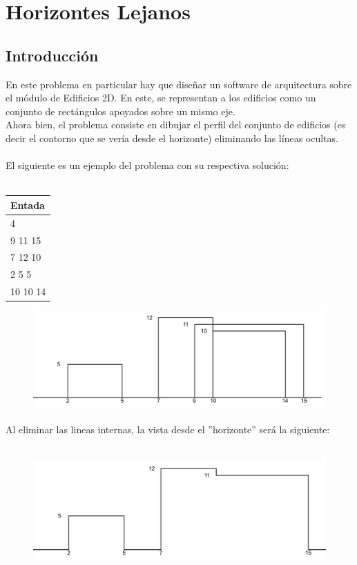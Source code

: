 \section{Horizontes Lejanos}
\subsection{Introducci\'on}

En este problema en particular hay que diseñar un software de arquitectura sobre el m\'odulo de Edificios 2D. En este, se representan a los edificios como un conjunto de rect\'angulos apoyados sobre un mismo eje. \\
Ahora bien, el problema consiste en dibujar el perfil del conjunto de edificios (es decir el contorno que se ver\'ia desde el horizonte) eliminando las l\'ineas ocultas. 
\\
\\
El siguiente es un ejemplo del problema con su respectiva soluci\'on: \\ \\

\begin{tabular}{| l |}
\hline
Entada \\ \hline
4 \\ 
9 11 15 \\ 
7 12 10 \\ 
2 5 5 \\ 
10 10 14 \\ \hline
\end{tabular}


\begin{figure}[H]
  \centering
	\includegraphics[scale=0.27]{./Imagenes/Ej2/Ejemplo-Entrada.png} 
\end{figure}



Al eliminar las lineas internas, la vista desde el ''horizonte'' ser\'a la siguiente: \\ \\


\begin{figure}[H]
  \centering
	\includegraphics[scale=0.27]{./Imagenes/Ej2/Ejemplo-Salida.png} 
\end{figure}


